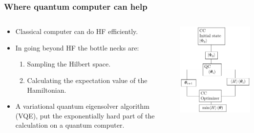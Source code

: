 \documentclass{beamer}
\renewcommand{\(}{\left(}
\renewcommand{\)}{\right)}
\renewcommand{\[}{\left[}
\renewcommand{\]}{\right]}
\begin{document}
\begin{frame}
    \frametitle{Where quantum computer can help}
    \begin{columns}
        \begin{column}[]{0.5\textwidth}
            \begin{itemize}
                \item Classical computer can do HF efficiently.
                \item In going beyond HF the bottle necks are: \begin{enumerate}
                    \item Sampling the Hilbert space. 
                    \item Calculating the expectation value of the Hamiltonian.
                \end{enumerate}  
                \item A variational quantum eigensolver algorithm (VQE), put the exponentially hard part of the calculation on a quantum computer. 
            \end{itemize}
        \end{column}
        \begin{column}[]{0.5\textwidth}
            \begin{center}
                \includegraphics[scale=0.93]{VQE_flow_chart.pdf}
            \end{center}
        \end{column}
    \end{columns}
   
\end{frame}
\end{document}
